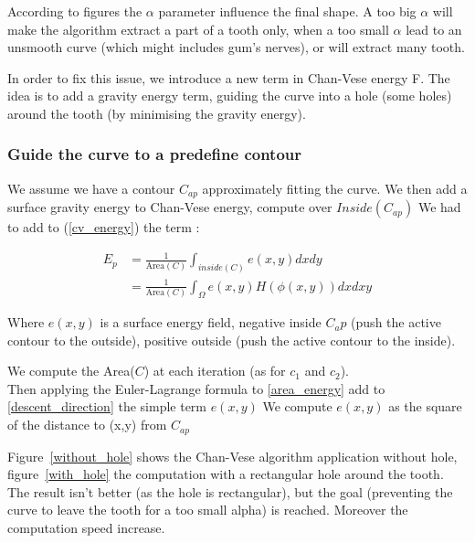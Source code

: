According to figures  the $\alpha$ parameter influence the final shape. A too big $\alpha$ will make the algorithm extract a part of a tooth only, when a too small $\alpha$ lead to an unsmooth curve (which might includes gum's nerves), or will extract many tooth.  

In order to fix this issue, we introduce a new term in Chan-Vese energy F. The idea is to add a gravity energy term, guiding the curve into a hole (some holes) around the tooth (by minimising the gravity energy).

\subsubsection*{Guide the curve to a predefine contour}

We assume we have a contour $C_{ap}$ approximately fitting the curve. We then add a surface gravity energy to Chan-Vese energy, compute over $Inside(C_{ap})$
We had to add to (\ref{cv_energy}) the term :

\begin{equation}
\begin{split}
    E_p &= \frac{1}{\text{Area}(C)} \int_{inside(C)} e(x,y)dxdy \\ &=  \frac{1}{\text{Area}(C)}\int_{\Omega} e(x,y) H(\phi(x,y))dxdxy 
\label{area_energy}
\end{split}
\end{equation}

Where $e(x,y)$ is a surface energy field, negative inside $C_ap$ (push the active contour to the outside), positive outside (push the active contour to the inside).

We compute the Area($C$) at each iteration (as for $c_1$ and $c_2$). \\
Then applying the Euler-Lagrange formula to \ref{area_energy} add to \ref{descent_direction} the simple term $e(x,y)$
We compute $e(x,y)$ as the square of the distance to (x,y) from $C_{ap}$

Figure~\ref{without_hole} shows the Chan-Vese algorithm application without hole, figure~\ref{with_hole} the computation with a rectangular hole around the tooth. The result isn't better (as the hole is rectangular), but the goal (preventing the curve to leave the tooth for a too small alpha) is reached. Moreover the computation speed increase. 

